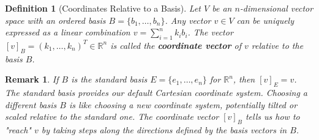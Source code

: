 \documentclass[11pt, a4paper]{article}
\theoremstyle{mydefinitionstyle}
\newtheorem{definition}{Definition}[section]
\newtheorem{remark}{Remark}[section]
\theoremstyle{mytheoremstyle}
\newcommand{\R}{\mathbb{R}}
\begin{document}
\begin{definition}[Coordinates Relative to a Basis] \label{def:coordinates}
    Let $V$ be an $n$-dimensional vector space with an ordered basis $B = \{b_1, \dots, b_n\}$. Any vector $v \in V$ can be uniquely expressed as a linear combination $v = \sum_{i=1}^{n} k_i b_i$. The vector $[v]_B = (k_1, \dots, k_n)^T \in \R^n$ is called the \textbf{coordinate vector} of $v$ relative to the basis $B$.
\end{definition}

\begin{remark}
    If $B$ is the standard basis $E = \{e_1, \dots, e_n\}$ for $\R^n$, then $[v]_E = v$. The standard basis provides our default Cartesian coordinate system. Choosing a different basis $B$ is like choosing a new coordinate system, potentially tilted or scaled relative to the standard one. The coordinate vector $[v]_B$ tells us how to "reach" $v$ by taking steps along the directions defined by the basis vectors in $B$.
\end{remark}
\end{document}
